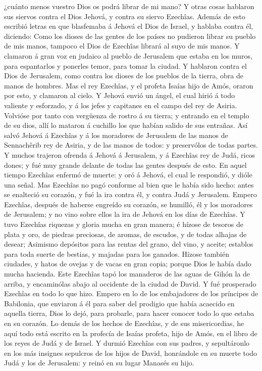 ¿cuánto menos vuestro Dios os podrá librar de mi mano?  Y
otras cosas hablaron sus siervos contra el Dios Jehová, y contra su
siervo Ezechîas.  Además de esto escribió letras en que
blasfemaba á Jehová el Dios de Israel, y hablaba contra él, diciendo:
Como los dioses de las gentes de los países no pudieron librar su pueblo
de mis manos, tampoco el Dios de Ezechîas librará al suyo de mis manos.
 Y clamaron á gran voz en judaico al pueblo de Jerusalem
que estaba en los muros, para espantarlos y ponerles temor, para tomar
la ciudad.  Y hablaron contra el Dios de Jerusalem, como
contra los dioses de los pueblos de la tierra, obra de manos de hombres.
 Mas el rey Ezechîas, y el profeta Isaías hijo de Amós,
oraron por esto, y clamaron al cielo.  Y Jehová envió un
ángel, el cual hirió á todo valiente y esforzado, y á los jefes y
capitanes en el campo del rey de Asiria. Volvióse por tanto con
vergüenza de rostro á su tierra; y entrando en el templo de su dios,
allí lo mataron á cuchillo los que habían salido de sus entrañas.
 Así salvó Jehová á Ezechîas y á los moradores de
Jerusalem de las manos de Sennachêrib rey de Asiria, y de las manos de
todos: y preservólos de todas partes.  Y muchos trajeron
ofrenda á Jehová á Jerusalem, y á Ezechîas rey de Judá, ricos dones; y
fué muy grande delante de todas las gentes después de esto.
 En aquel tiempo Ezechîas enfermó de muerte: y oró á
Jehová, el cual le respondió, y dióle una señal.  Mas
Ezechîas no pagó conforme al bien que le había sido hecho: antes se
enalteció su corazón, y fué la ira contra él, y contra Judá y Jerusalem.
 Empero Ezechîas, después de haberse engreído su corazón,
se humilló, él y los moradores de Jerusalem; y no vino sobre ellos la
ira de Jehová en los días de Ezechîas.  Y tuvo Ezechîas
riquezas y gloria mucha en gran manera; é hízose de tesoros de plata y
oro, de piedras preciosas, de aromas, de escudos, y de todas alhajas de
desear;  Asimismo depósitos para las rentas del grano,
del vino, y aceite; establos para toda suerte de bestias, y majadas para
los ganados.  Hízose también ciudades, y hatos de ovejas
y de vacas en gran copia; porque Dios le había dado mucha hacienda.
 Este Ezechîas tapó los manaderos de las aguas de Gihón
la de arriba, y encaminólas abajo al occidente de la ciudad de David. Y
fué prosperado Ezechîas en todo lo que hizo.  Empero en
lo de los embajadores de los príncipes de Babilonia, que enviaron á él
para saber del prodigio que había acaecido en aquella tierra, Dios lo
dejó, para probarle, para hacer conocer todo lo que estaba en su
corazón.  Lo demás de los hechos de Ezechîas, y de sus
misericordias, he aquí todo está escrito en la profecía de Isaías
profeta, hijo de Amós, en el libro de los reyes de Judá y de Israel.
 Y durmió Ezechîas con sus padres, y sepultáronlo en los
más insignes sepulcros de los hijos de David, honrándole en su muerte
todo Judá y los de Jerusalem: y reinó en su lugar Manasés su hijo.

